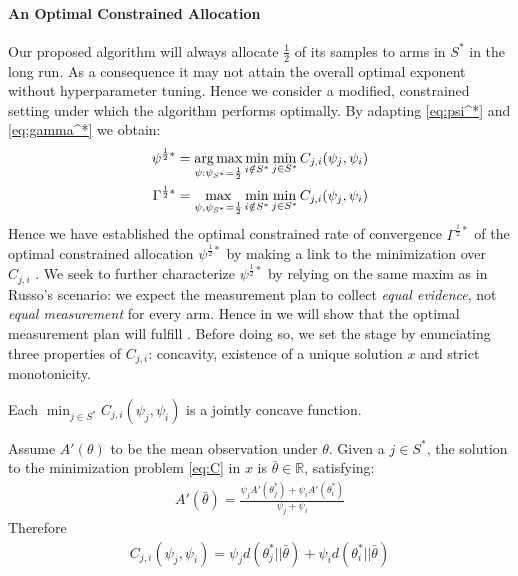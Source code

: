 \paragraph{An Optimal Constrained Allocation}

Our proposed algorithm will always allocate $\frac{1}{2}$ of its samples to arms
in $S^*$ in the long run. As a consequence it may not attain the overall optimal
exponent without hyperparameter tuning. Hence we consider a modified,
constrained setting under which the algorithm performs optimally. By adapting
\eqref{eq:psi^*} and \eqref{eq:gamma^*} we obtain:
\begin{align}
  \psi^{\frac{1}{2}*} &= \operatorname*{arg\,max}_{\psi: \psi_{S^*}=\frac{1}{2}} \min_{i \notin
      S^*}\min_{j \in S^*} C_{j, i}(\psi_j, \psi_i)
      \label{eq:constrained_optimal_psi}\\
  \Gamma^{\frac{1}{2}*} &= \max_{\psi, \psi_{S^*} = \frac{1}{2}} \min_{i \notin
      S^*} \min_{j \in S^*} C_{j, i}(\psi_j, \psi_i)
      \label{eq:constrained_optimal_gamma}
\end{align}
Hence we have established the optimal constrained rate of convergence
$\Gamma^{\frac{1}{2}*}$ of the optimal constrained allocation
$\psi^{\frac{1}{2}*}$ by making a link to the minimization over $C_{j, i}$ . We
seek to further characterize $\psi^{\frac{1}{2}*}$ by relying on the same maxim
as in Russo's scenario: we expect the measurement plan to collect \emph{equal
evidence}, not \emph{equal measurement} for every arm. Hence in
 we will show that the optimal measurement
plan will fulfill . Before doing so, we set the stage by
enunciating three properties of $C_{j, i}$: concavity, existence of a unique
solution $x$ and strict monotonicity.

\begin{lemma}\label{lemma:C_concave}
  Each $\min_{j \in S^*} C_{j, i}(\psi_j, \psi_i)$ is a jointly concave
  function.
\end{lemma}

\begin{lemma}\label{lemma:C_unique_solution}
  Assume $A'(\theta)$ to be the mean observation under $\theta$. Given a $j \in
  S^*$, the solution to the minimization problem \eqref{eq:C} in $x$ is
  $\bar{\theta} \in \mathbb{R}$, satisfying:
  \begin{align}
    A'(\bar{\theta}) = \frac{\psi_j A'(\theta_j^*) + \psi_i
        A'(\theta_i^*)}{\psi_j + \psi_i}
  \end{align}
  Therefore
  \begin{align}
    C_{j, i}(\psi_j, \psi_i) = \psi_j d(\theta^*_j || \bar{\theta}) + \psi_i
        d(\theta^*_i || \bar{\theta})
  \end{align}
\end{lemma}

